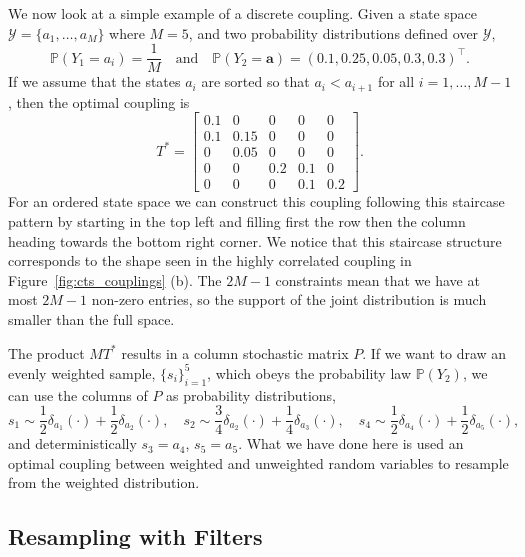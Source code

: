 \documentclass[final]{siamltex}
\begin{document}
We now look at a simple example of a discrete coupling. Given a state space $\mathcal{Y} = \{a_1,
\dots, a_M\}$ where $M=5$, and two probability distributions defined over $\mathcal{Y}$,
\[
\mathbb{P}(Y_1 = a_i) = \frac{1}{M} \quad \text{and} \quad \mathbb{P}(Y_2 = \mathbf{a}) = (0.1,
0.25, 0.05, 0.3, 0.3)^\top.
\]
If we assume that the states $a_i$ are sorted so that $a_i < a_{i+1}$ for all $i=1,\dots,M-1$, then
the optimal coupling is
\[
	T^* = \begin{bmatrix} 0.1 & 0      & 0    & 0    & 0 \\
					       0.1 & 0.15 & 0    & 0    & 0 \\
					       0    & 0.05 & 0    & 0    & 0 \\
					       0    & 0      & 0.2 & 0.1 & 0 \\
					       0    & 0      & 0    & 0.1 & 0.2
		\end{bmatrix}.
\]
For an ordered state space we can construct this coupling following this staircase pattern by
starting in the top left and filling first the row then the column heading towards the bottom right
corner. We notice that this staircase structure corresponds to the shape seen in the highly
correlated coupling in Figure~\ref{fig:cts_couplings} (b). The $2M-1$ constraints mean that we have
at most $2M-1$ non-zero entries, so the support of the joint distribution is much smaller than the
full space.

The product $MT^*$ results in a column stochastic matrix $P$. If we want to draw an evenly weighted
sample, $\{s_i\}_{i=1}^5$, which obeys the probability law $\mathbb{P}(Y_2)$, we can use the columns
of $P$ as probability distributions,
\[
	s_1 \sim \frac{1}{2}\delta_{a_1}(\cdot)+\frac{1}{2}\delta_{a_2}(\cdot), \quad s_2 \sim
		\frac{3}{4}\delta_{a_2}(\cdot)+\frac{1}{4}\delta_{a_3}(\cdot), \quad s_4 \sim
		\frac{1}{2}\delta_{a_4}(\cdot)+\frac{1}{2}\delta_{a_5}(\cdot),
\]
and deterministically $s_3 = a_4$, $s_5 = a_5$. What we have done here is used an optimal coupling
between weighted and unweighted random variables to resample from the weighted distribution.


\subsection{Resampling with Filters}
\label{sec:OT}
\end{document}
